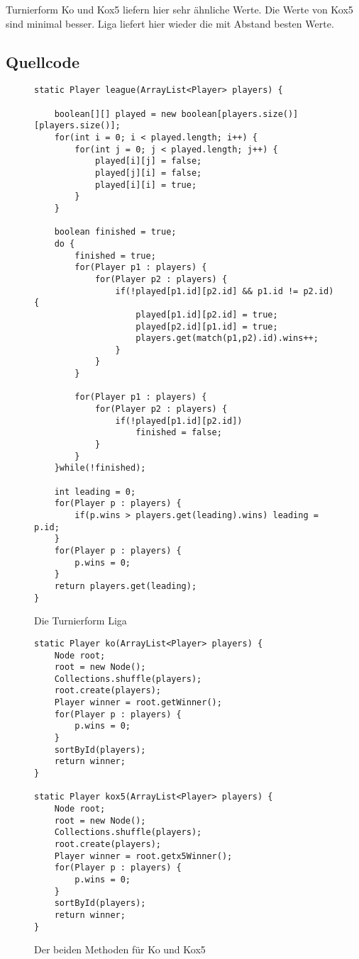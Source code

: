 \documentclass[a4paper, 12pt]{scrartcl}
\begin{document}
Turnierform Ko und Kox5 liefern hier sehr ähnliche Werte. Die Werte von Kox5 sind minimal besser. Liga liefert hier wieder die mit Abstand besten Werte.

\subsection{Quellcode}

\begin{figure}[H]
    \centering
\begin{lstlisting}
static Player league(ArrayList<Player> players) {
    
    boolean[][] played = new boolean[players.size()][players.size()];
    for(int i = 0; i < played.length; i++) {
        for(int j = 0; j < played.length; j++) {
            played[i][j] = false;
            played[j][i] = false;
            played[i][i] = true;
        }
    }
    
    boolean finished = true;
    do {
        finished = true;
        for(Player p1 : players) {
            for(Player p2 : players) {
                if(!played[p1.id][p2.id] && p1.id != p2.id) {
                    played[p1.id][p2.id] = true;
                    played[p2.id][p1.id] = true;
                    players.get(match(p1,p2).id).wins++;
                }
            }
        }

        for(Player p1 : players) {
            for(Player p2 : players) {
                if(!played[p1.id][p2.id])
                    finished = false;
            }
        }
    }while(!finished);

    int leading = 0;
    for(Player p : players) {
        if(p.wins > players.get(leading).wins) leading = p.id;
    }
    for(Player p : players) {
        p.wins = 0;
    }
    return players.get(leading);
}
\end{lstlisting}
\caption{Die Turnierform Liga}
\end{figure}

\begin{figure}[H]
    \centering
    \begin{lstlisting}
static Player ko(ArrayList<Player> players) {
    Node root;
    root = new Node();
    Collections.shuffle(players);
    root.create(players);
    Player winner = root.getWinner();
    for(Player p : players) {
        p.wins = 0;
    }
    sortById(players);
    return winner;
}

static Player kox5(ArrayList<Player> players) {
    Node root;
    root = new Node();
    Collections.shuffle(players);
    root.create(players);
    Player winner = root.getx5Winner();
    for(Player p : players) {
        p.wins = 0;
    }
    sortById(players);
    return winner;
}
    \end{lstlisting}
    \caption{Der beiden Methoden für Ko und Kox5}
\end{figure}
\end{document}
